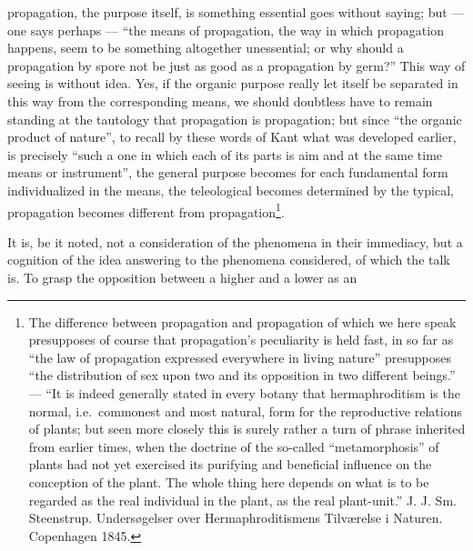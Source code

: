 \documentclass[12pt,a4paper]{book}
\begin{document}
\setcounter{footnote}{0}
propagation, the purpose itself, is something essential goes without saying; but
--- one says perhaps --- ``the means of propagation, the way in which propagation
happens, seem to be something altogether unessential; or why should a propagation
by spore not be just as good as a propagation by germ?'' This way of seeing is
without idea. Yes, if the organic purpose really let itself be separated in this
way from the corresponding means, we should doubtless have to remain standing at
the tautology that propagation is propagation; but since ``the organic product of
nature'', to recall by these words of Kant what was developed earlier, is
precisely ``such a one in which each of its parts is aim and at the same time
means or instrument'', the general purpose becomes for each fundamental form
individualized in the means, the teleological becomes determined by the typical,
propagation becomes different from propagation\footnote{The difference between
propagation and propagation of which we here speak presupposes of course that
propagation's peculiarity is held fast, in so far as ``the law of propagation
expressed everywhere in living nature'' presupposes ``the distribution of sex upon
two and its opposition in two different beings.'' --- ``It is indeed generally
stated in every botany that hermaphroditism is the normal, i.e.\ commonest and
most natural, form for the reproductive relations of plants; but seen more closely
this is surely rather a turn of phrase inherited from earlier times, when the
doctrine of the so-called ``metamorphosis'' of plants had not yet exercised its
purifying and beneficial influence on the conception of the plant. The whole thing
here depends on what is to be regarded as the real individual in the plant, as the
real plant-unit.'' J. J. Sm. Steenstrup. Undersøgelser over Hermaphroditismens
Tilværelse i Naturen. Copenhagen 1845.}.

It is, be it noted, not a consideration of the phenomena in their immediacy, but a
cognition of the idea answering to the phenomena considered, of which the talk is.
To grasp the opposition between a higher and a lower as an
\end{document}
